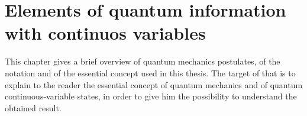 \chapter[Continuos Variables States]{Elements of quantum information with continuos variables}
    This chapter gives a brief overview of quantum mechanics postulates,
    of the notation and of the essential concept used in this thesis. 
    The target of that is to explain to the reader the essential concept of quantum mechanics
    and of quantum continuous-variable states, in 
    order to give him the possibility to understand the obtained result.

    



    
    
    

    

